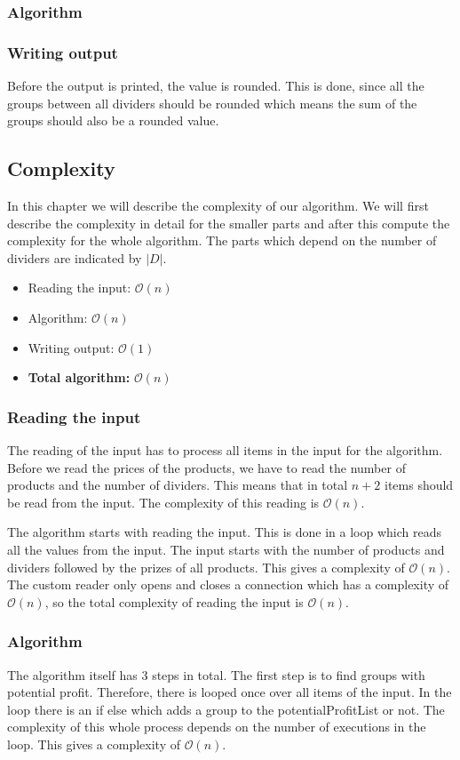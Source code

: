 \documentclass{article}
\newcommand{\bigO}[1]{\mathcal{O}(#1)}
\begin{document}
\subsubsection{Algorithm}

\subsubsection{Writing output}
Before the output is printed, the value is rounded. This is done, since all the groups between all dividers should be rounded which means the sum of the groups should also be a rounded value.

\subsection{Complexity}
In this chapter we will describe the complexity of our algorithm. We will first describe the complexity in detail for the smaller parts and after this compute the complexity for the whole algorithm. The parts which depend on the number of dividers are indicated by $|D|$.

\begin{itemize}
  \item Reading the input: $\bigO{n}$
  \item Algorithm: $\bigO{n}$
  \item Writing output: $\bigO{1}$
  \item \textbf{Total algorithm:} $\bigO{n}$
\end{itemize}

\subsubsection{Reading the input}
The reading of the input has to process all items in the input for the algorithm. Before we read the prices of the products, we have to read the number of products and the number of dividers. This means that in total $n + 2$ items should be read from the input. The complexity of this reading is $\bigO{n}$.

The algorithm starts with reading the input. This is done in a loop which reads all the values from the input. The input starts with the number of products and dividers followed by the prizes of all products. This gives a complexity of $\bigO{n}$. The custom reader only opens and closes a connection which has a complexity of $\bigO{n}$, so the total complexity of reading the input is $\bigO{n}$.

\subsubsection{Algorithm}
The algorithm itself has 3 steps in total. The first step is to find groups with potential profit. Therefore, there is looped once over all items of the input. In the loop there is an if else which adds a group to the potentialProfitList or not. The complexity of this whole process depends on the number of executions in the loop. This gives a complexity of $\bigO{n}$.
\end{document}
